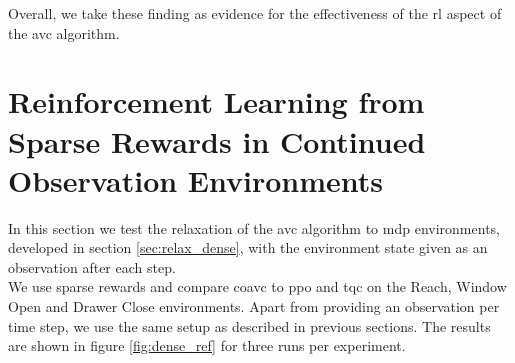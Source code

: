 Overall, we take these finding as evidence for the effectiveness of the \ac{rl} aspect of the \ac{avc} algorithm.


\section{Reinforcement Learning from Sparse Rewards in Continued Observation Environments}
\label{sec_exp_con_obs}
In this section we test the relaxation of the \ac{avc} algorithm to \ac{mdp} environments, developed in section \ref{sec:relax_dense}, with the environment state given as an observation after each step. \\
We use sparse rewards 
and compare \ac{coavc} to \ac{ppo} and \ac{tqc} on the Reach, Window Open and Drawer Close environments. Apart from 
providing an observation per time step,
we use the same setup as described in previous sections. The results are shown in figure \ref{fig:dense_ref} for three runs per experiment.\\ 

